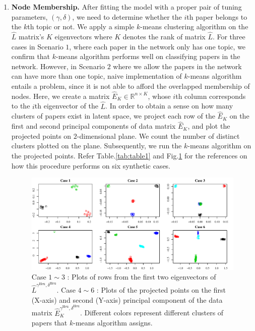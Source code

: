 \documentclass[AMS,STIX1COL]{WileyNJD-v2}
\begin{document}
{\begin{enumerate}
    \item \textbf{Node Membership.}
    After fitting the model with a proper pair of tuning parameters, $(\gamma,\delta)$, we need to determine whether the $i$th paper belongs to the $k$th topic or not.
    We apply a simple $k$-means clustering algorithm on the $\widehat{L}$ matrix’s $K$ eigenvectors where $K$ denotes the rank of matrix $\widehat{L}$.
    For three cases in Scenario $1$, where each paper in the network only has one topic, we confirm that $k$-means algorithm performs well on classifying papers in the network.
    However, in Scenario $2$ where we allow the papers in the network can have more than one topic, naive implementation of $k$-means algorithm entails a problem, since it is not able to afford the overlapped membership of nodes.
    Here, we create a matrix $\widehat{E}_{K}\in \mathbb{R}^{n \times K}$, whose $i$th column corresponds to the $i$th eigenvector of the $\widehat{L}$.
    In order to obtain a sense on how many clusters of papers exist in latent space, we project each row of the $\widehat{E}_{K}$ on the first and second principal components of data matrix $\widehat{E}_{K}$, and plot the projected points on $2$-dimensional plane.
    We count the number of distinct clusters plotted on the plane. Subsequently, we run the $k$-means algorithm on the projected points.
    Refer Table.\ref{tab:table1} and Fig.\ref{fig:figure3} for the references on how this procedure performs on six synthetic cases.

    \begin{figure}[htbp]
    \centering
    \includegraphics[width=1\textwidth]{Fig3.pdf}
    \caption{ Case $1\sim3$ : Plots of rows from the first two eigenvectors of $\widehat{L}^{\gamma^{\text{Heu}},\delta^{\text{Heu}}}$.
    Case $4 \sim 6$ : Plots of the projected points on the first (X-axis) and second (Y-axis) principal component of the data matrix $\widehat{E}_{K}^{\gamma^{\text{Heu}},\delta^{\text{Heu}}}$. Different colors represent different clusters of papers that $k$-means algorithm assigns.}
    \label{fig:figure3}
    \end{figure}


\end{enumerate}}
\end{document}
